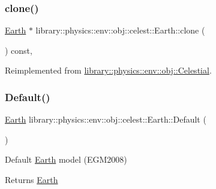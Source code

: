 \subsubsection{\texorpdfstring{clone()}{clone()}}
{\footnotesize\ttfamily \hyperlink{classlibrary_1_1physics_1_1env_1_1obj_1_1celest_1_1_earth}{Earth} $\ast$ library\+::physics\+::env\+::obj\+::celest\+::\+Earth\+::clone (\begin{DoxyParamCaption}{ }\end{DoxyParamCaption}) const\hspace{0.3cm}{\ttfamily [override]}, {\ttfamily [virtual]}}



Reimplemented from \hyperlink{classlibrary_1_1physics_1_1env_1_1obj_1_1_celestial_aaf8aa41a0ff9336eba62c07e3c27f82d}{library\+::physics\+::env\+::obj\+::\+Celestial}.

\mbox{\label{classlibrary_1_1physics_1_1env_1_1obj_1_1celest_1_1_earth_a01853b8ce201525ee6cec2f00e1580d4}} 
\subsubsection{\texorpdfstring{Default()}{Default()}}
{\footnotesize\ttfamily \hyperlink{classlibrary_1_1physics_1_1env_1_1obj_1_1celest_1_1_earth}{Earth} library\+::physics\+::env\+::obj\+::celest\+::\+Earth\+::\+Default (\begin{DoxyParamCaption}{ }\end{DoxyParamCaption})\hspace{0.3cm}{\ttfamily [static]}}



Default \hyperlink{classlibrary_1_1physics_1_1env_1_1obj_1_1celest_1_1_earth}{Earth} model (E\+G\+M2008) 

\begin{DoxyReturn}{Returns}
\hyperlink{classlibrary_1_1physics_1_1env_1_1obj_1_1celest_1_1_earth}{Earth} 
\end{DoxyReturn}
\mbox{\label{classlibrary_1_1physics_1_1env_1_1obj_1_1celest_1_1_earth_a24492fd9077ed4ac7d55118f3f98e30c}} 

